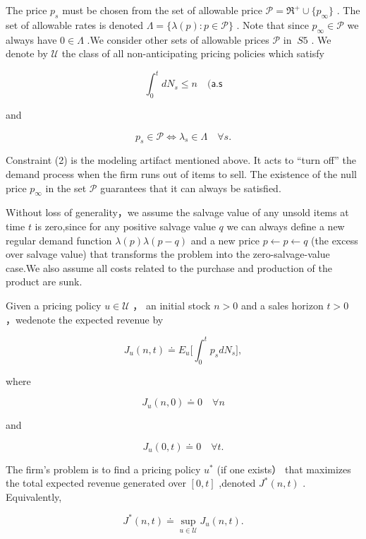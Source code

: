 The price \(p _ { s }\) must be chosen from the set of allowable price
\(\mathcal P = \mathfrak R ^ { + } \cup \{ p _ { \infty } \}\) . The set
of allowable rates is denoted
\(\Lambda = \{ \lambda ( p ) : p \in \mathcal { P } \}\) . Note that
since \(p _ { \infty } \in \mathcal { P }\) we always have
\(0 \in \Lambda\) .We consider other sets of allowable prices
\(\mathcal { P }\) in \(\ S 5\) . We denote by \(\mathcal { U }\) the
class of all non-anticipating pricing policies which satisfy

\[
\int _ { 0 } ^ { t } d N _ { s } \leq n \quad ( \mathsf { a . s }
\]

and

\[
p _ { s } \in \mathcal { P } \Leftrightarrow \lambda _ { s } \in \Lambda \quad \forall s .
\]

Constraint (2) is the modeling artifact mentioned above. It acts to
``turn off'' the demand process when the firm runs out of items to sell.
The existence of the null price \(p _ { \infty }\) in the set
\(\mathcal { P }\) guarantees that it can always be satisfied.

Without loss of generality，we assume the salvage value of any unsold
items at time \(t\) is zero,since for any positive salvage value \(q\)
we can always define a new regular demand function
\(\lambda ( p )  \lambda ( p - q )\) and a new price
\(p \gets p \gets q\) (the excess over salvage value) that transforms
the problem into the zero-salvage-value case.We also assume all costs
related to the purchase and production of the product are sunk.

Given a pricing policy \(u \in \mathcal { U }\) ， an initial stock
\(n > 0\) and a sales horizon \(t > 0\) ，wedenote the expected revenue
by

\[
J _ { u } ( n , t ) \doteq E _ { u } \biggl [ \int _ { 0 } ^ { t } p _ { s } d N _ { s } \biggr ] ,
\]

where

\[
J _ { u } ( n , 0 ) \doteq 0 \quad \forall n
\]

and

\[
J _ { u } ( 0 , t ) \doteq 0 \quad \forall t .
\]

The firm's problem is to find a pricing policy \(u ^ { * }\) (if one
exists） that maximizes the total expected revenue generated over
\([ 0 , t ]\) ,denoted \(J ^ { * } ( n , t )\) . Equivalently,

\[
J ^ { * } ( n , t ) \doteq \operatorname* { s u p } _ { u \in \mathcal { U } } J _ { u } ( n , t ) .
\]

